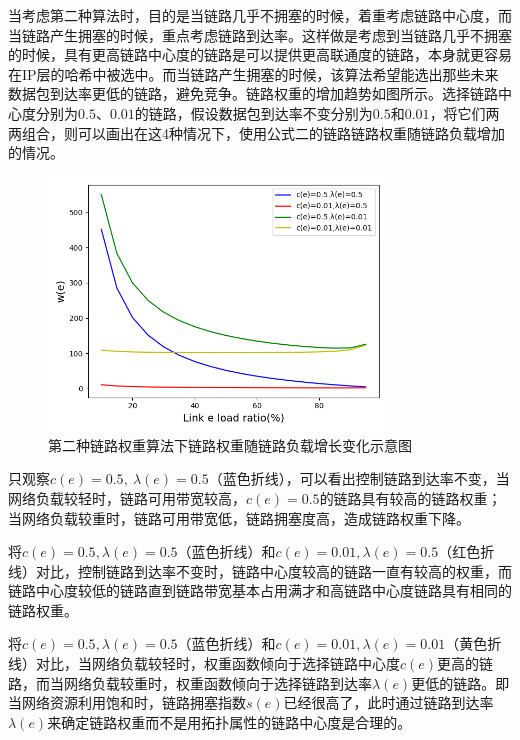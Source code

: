 当考虑第二种算法时，目的是当链路几乎不拥塞的时候，着重考虑链路中心度，而当链路产生拥塞的时候，重点考虑链路到达率。这样做是考虑到当链路几乎不拥塞的时候，具有更高链路中心度的链路是可以提供更高联通度的链路，本身就更容易在IP层的哈希中被选中。而当链路产生拥塞的时候，该算法希望能选出那些未来数据包到达率更低的链路，避免竞争。链路权重的增加趋势如图所示。选择链路中心度分别为$0.5$、$0.01$的链路，假设数据包到达率不变分别为$0.5$和$0.01$，将它们两两组合，则可以画出在这4种情况下，使用公式二的链路链路权重随链路负载增加的情况。

\begin{figure}[htbp]
\setlength{\abovecaptionskip}{15pt plus 3pt minus 2pt}
\centerline{\includegraphics[width=0.8\textwidth]{./figures/ch3-link-weight-function-2.png}}
\caption{第二种链路权重算法下链路权重随链路负载增长变化示意图}
\label{fig-ch3-link-weight-function-2}
\end{figure}

只观察$c(e)=0.5,\ \lambda(e)=0.5$（蓝色折线），可以看出控制链路到达率不变，当网络负载较轻时，链路可用带宽较高，$c(e)=0.5$的链路具有较高的链路权重；当网络负载较重时，链路可用带宽低，链路拥塞度高，造成链路权重下降。

将$c(e)=0.5,\lambda(e)=0.5$（蓝色折线）和$c\left(e\right)=0.01,\lambda\left(e\right)=0.5$（红色折线）对比，控制链路到达率不变时，链路中心度较高的链路一直有较高的权重，而链路中心度较低的链路直到链路带宽基本占用满才和高链路中心度链路具有相同的链路权重。

将$c(e)=0.5,\lambda(e)=0.5$（蓝色折线）和$c\left(e\right)=0.01,\lambda\left(e\right)=0.01$（黄色折线）对比，当网络负载较轻时，权重函数倾向于选择链路中心度$c\left(e\right)$更高的链路，而当网络负载较重时，权重函数倾向于选择链路到达率$\lambda\left(e\right)$更低的链路。即当网络资源利用饱和时，链路拥塞指数$s\left(e\right)$已经很高了，此时通过链路到达率$\lambda\left(e\right)$来确定链路权重而不是用拓扑属性的链路中心度是合理的。

